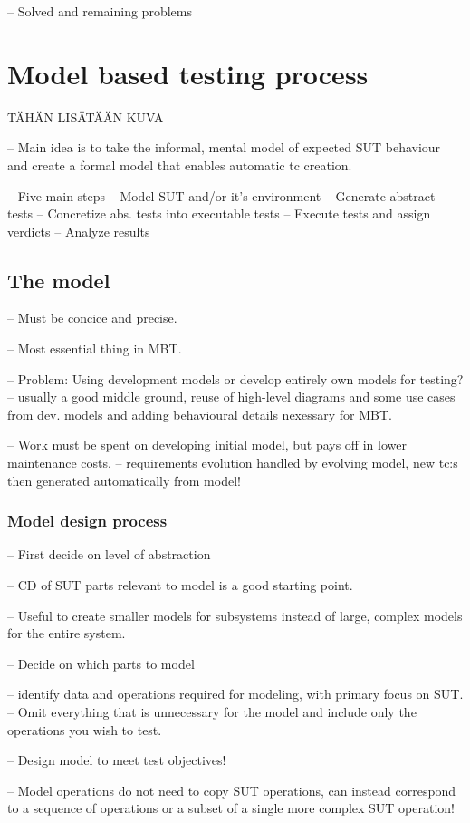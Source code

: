 -- Solved and remaining problems

\section{Model based testing process}
TÄHÄN LISÄTÄÄN KUVA

-- Main idea is to take the informal, mental model of expected SUT behaviour and create a formal model that enables automatic tc creation. 

-- Five main steps
	-- Model SUT and/or it's environment
	-- Generate abstract tests
	-- Concretize abs. tests into executable tests
	-- Execute tests and assign verdicts
	-- Analyze results

\subsection{The model}
-- Must be concice and precise. 

-- Most essential thing in MBT.

-- Problem: Using development models or develop entirely own models for testing? 
	-- usually a good middle ground, reuse of high-level diagrams and some use cases from dev. models and adding behavioural details nexessary for MBT.

-- Work must be spent on developing initial model, but pays off in lower maintenance costs.
	-- requirements evolution handled by evolving model, new tc:s then generated automatically from model! 
	
\subsubsection{Model design process}
-- First decide on level of abstraction

-- CD of SUT parts relevant to model is a good starting point.

-- Useful to create smaller models for subsystems instead of large, complex models for the entire system. 

-- Decide on which parts to model

-- identify data and operations required for modeling, with primary focus on SUT.
	-- Omit everything that is unnecessary for the model and include only the operations you wish to test.
	
-- Design model to meet test objectives!

-- Model operations do not need to copy SUT operations, can instead correspond to a sequence of operations or a subset of a single more complex SUT operation!

